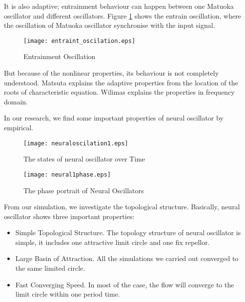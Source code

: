 It is also adaptive; entrainment behaviour can happen between one Matuoka oscillator and different oscillators. 
Figure \ref{fig:entraint-oscilation} shows the entrain oscillation,
where the oscillation of Matuoka oscillator synchronise with the input signal.
\begin{figure}[h]
\texttt{[image: entraint\_oscilation.eps]}
\caption{Entrainment Oscillation}
\label{fig:entraint-oscilation}
\end{figure}

But because of the nonlinear properties, its behaviour is not completely understood. 
Matsuta\citep{Matsuoka1987} explains the adaptive properties from the location of the roots of characteristic equation. 
Wilimas\citep{Williamson1998} explains the properties in frequency domain.



In our research, we find some important properties of neural oscillator by empirical.

\begin{figure}
\begin{center}
\texttt{[image: neuraloscilation1.eps]}
\end{center}
\caption{The states of neural oscillator over Time}
\label{fig:oscilation}
\end{figure}

\begin{figure}
\begin{center}
\texttt{[image: neural1phase.eps]}
\end{center}
\caption{The phase portrait of Neural Oscillators}
\label{fig:oscilationphase}
\end{figure}

From our simulation, we investigate the topological structure.
Basically, neural oscillator shows three important properties:
\begin{itemize}
\item{Simple Topological Structure.}
The topology structure of neural oscillator is simple, 
it includes one  attractive limit circle and one fix repellor.
\item{Large Basin of Attraction.}
All the simulations we carried out converged to the same limited circle.
\item{Fast Converging Speed.}
In most of the case, the flow will converge to the limit circle within one period time.
\end{itemize}

